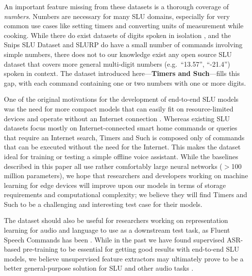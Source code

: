\documentclass{article}
\begin{document}
An important feature missing from these datasets is a thorough coverage of \textit{numbers}. Numbers are necessary for many SLU domains, especially for very common use cases like setting timers and converting units of measurement while cooking. 
While there do exist datasets of digits spoken in isolation \cite{leonard1993tidigits, warden2018speech, zohar_jackson_2018_1342401}, and the Snips SLU Dataset and SLURP do have a small number of commands involving simple numbers, there does not to our knowledge exist any open source SLU dataset that covers more general multi-digit numbers (e.g.~``13.57'', ``-21.4'') spoken in context. The dataset introduced here---\textbf{Timers and Such}---fills this gap, with each command containing one or two numbers with one or more digits. 

One of the original motivations for the development of end-to-end SLU models was the need for more compact models that can easily fit on resource-limited devices and operate without an Internet connection \cite{Serdyuk2018}. Whereas existing SLU datasets focus mostly on Internet-connected smart home commands or queries that require an Internet search, Timers and Such is composed only of commands that can be executed without the need for the Internet. This makes the dataset ideal for training or testing a simple offline voice assistant. While the baselines described in this paper all use rather comfortably large neural networks ($>$100 million parameters), we hope that researchers and developers working on machine learning for edge devices will improve upon our models in terms of storage requirements and computational complexity; we believe they will find Timers and Such to be a challenging and interesting test case for their models. 

The dataset should also be useful for researchers working on representation learning for audio and language to use as a downstream test task, as Fluent Speech Commands has been \cite{tamkin2020viewmaker, chung2020semi}. While in the past we have found supervised ASR-based pre-training to be essential for getting good results with end-to-end SLU models, we believe unsupervised feature extractors may ultimately prove to be a better general-purpose solution for SLU and other audio tasks \cite{pascual2019learning, baevski2020wav2vec}.
\end{document}
